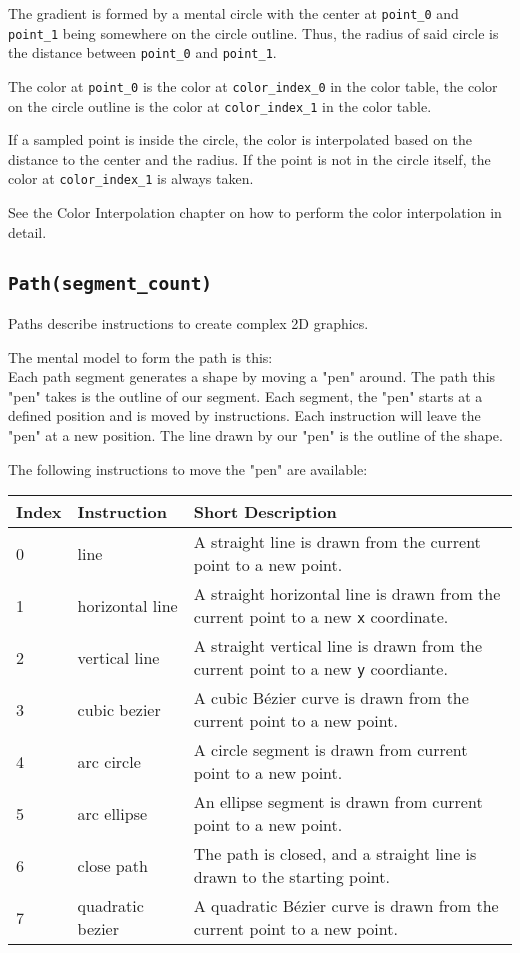 \documentclass[]{article}
\begin{document}
The gradient is formed by a mental circle with the center at
\texttt{point\_0} and \texttt{point\_1} being somewhere on the circle
outline. Thus, the radius of said circle is the distance between
\texttt{point\_0} and \texttt{point\_1}.

The color at \texttt{point\_0} is the color at \texttt{color\_index\_0}
in the color table, the color on the circle outline is the color at
\texttt{color\_index\_1} in the color table.

If a sampled point is inside the circle, the color is interpolated based
on the distance to the center and the radius. If the point is
not in the circle itself, the color at \texttt{color\_index\_1} is
always taken.

See the \hypertarget{color-interpolation}{Color Interpolation} chapter on how to perform the color interpolation in detail.

\hypertarget{pathsegment_count}{\subsection{\texorpdfstring{\texttt{Path(segment\_count)}}{Path(segment\_count)}}\label{pathsegment_count}}

Paths describe instructions to create complex 2D graphics.

The mental model to form the path is this:\\
Each path segment generates a shape by moving a "pen" around. The path
this "pen" takes is the outline of our segment. Each segment, the "pen"
starts at a defined position and is moved by instructions. Each
instruction will leave the "pen" at a new position. The line drawn by
our "pen" is the outline of the shape.

The following instructions to move the "pen" are available:

\begin{longtable}[]{@{}p{0.5in}p{1.0in}p{4.5in}@{}}
\toprule
Index & Instruction & Short Description \\
\midrule
\endhead
0 & line             & A straight line is drawn from the current point to a new point. \\
1 & horizontal line  & A straight horizontal line is drawn from the current point to a new \texttt{x} coordinate. \\
2 & vertical line    & A straight vertical line is drawn from the current point to a new \texttt{y} coordiante. \\
3 & cubic bezier     & A cubic Bézier curve is drawn from the current point to a new point. \\
4 & arc circle       & A circle segment is drawn from current point to a new point. \\
5 & arc ellipse      & An ellipse segment is drawn from current point to a new point. \\
6 & close path       & The path is closed, and a straight line is drawn to the starting point. \\
7 & quadratic bezier & A quadratic Bézier curve is drawn from the current point to a new point. \\
\bottomrule
\end{longtable}
\end{document}
